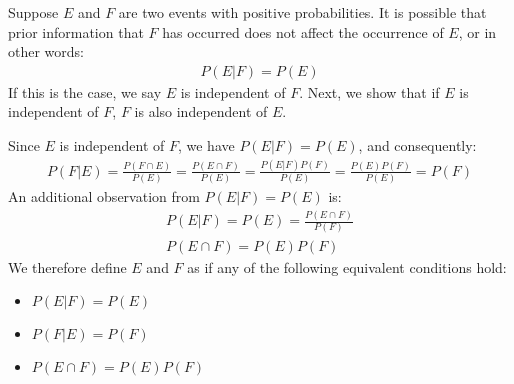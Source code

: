 Suppose \( E \) and \( F \) are two events with positive probabilities.
It is possible that prior information that \( F \) has occurred does not affect the occurrence of \( E \), or in other words:
\begin{align*}
	P(E | F) = P(E)
\end{align*}
If this is the case, we say \( E \) is independent of \( F \).
Next, we show that if \( E \) is independent of \( F \), \( F \) is also independent of \( E \).

Since \( E \) is independent of \( F \), we have \( P(E | F) = P(E) \), and consequently:
\begin{align*}
	P(F | E) = \frac{P(F \cap E)}{P(E)} = \frac{P(E \cap F)}{P(E)} = \frac{P(E | F)P(F)}{P(E)} = \frac{P(E)P(F)}{P(E)} = P(F)
\end{align*}
An additional observation from \( P(E | F) = P(E) \) is:
\begin{gather*}
	P(E | F) = P(E) = \frac{P(E \cap F)}{P(F)}\\
	P(E \cap F) = P(E)P(F)
\end{gather*}
We therefore define \( E \) and \( F \) as  if any of the following equivalent conditions hold:
\begin{itemize}
	\item \( P(E | F) = P(E) \)
	\item \( P(F | E) = P(F) \)
	\item \( P(E \cap F) = P(E)P(F) \)
\end{itemize}

